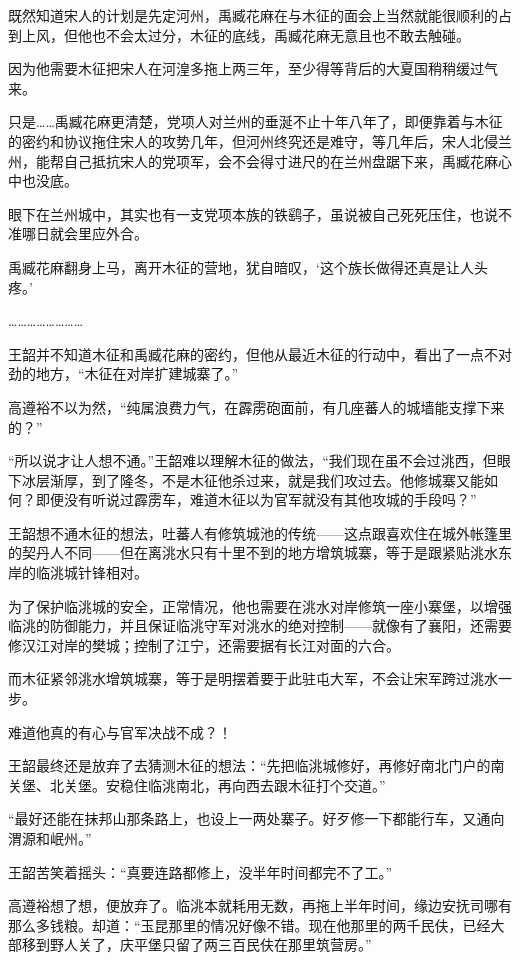 既然知道宋人的计划是先定河州，禹臧花麻在与木征的面会上当然就能很顺利的占到上风，但他也不会太过分，木征的底线，禹臧花麻无意且也不敢去触碰。

因为他需要木征把宋人在河湟多拖上两三年，至少得等背后的大夏国稍稍缓过气来。

只是……禹臧花麻更清楚，党项人对兰州的垂涎不止十年八年了，即便靠着与木征的密约和协议拖住宋人的攻势几年，但河州终究还是难守，等几年后，宋人北侵兰州，能帮自己抵抗宋人的党项军，会不会得寸进尺的在兰州盘踞下来，禹臧花麻心中也没底。

眼下在兰州城中，其实也有一支党项本族的铁鹞子，虽说被自己死死压住，也说不准哪日就会里应外合。

禹臧花麻翻身上马，离开木征的营地，犹自暗叹，‘这个族长做得还真是让人头疼。’

……………………

王韶并不知道木征和禹臧花麻的密约，但他从最近木征的行动中，看出了一点不对劲的地方，“木征在对岸扩建城寨了。”

高遵裕不以为然，“纯属浪费力气，在霹雳砲面前，有几座蕃人的城墙能支撑下来的？”

“所以说才让人想不通。”王韶难以理解木征的做法，“我们现在虽不会过洮西，但眼下冰层渐厚，到了隆冬，不是木征他杀过来，就是我们攻过去。他修城寨又能如何？即便没有听说过霹雳车，难道木征以为官军就没有其他攻城的手段吗？”

王韶想不通木征的想法，吐蕃人有修筑城池的传统——这点跟喜欢住在城外帐篷里的契丹人不同——但在离洮水只有十里不到的地方增筑城寨，等于是跟紧贴洮水东岸的临洮城针锋相对。

为了保护临洮城的安全，正常情况，他也需要在洮水对岸修筑一座小寨堡，以增强临洮的防御能力，并且保证临洮守军对洮水的绝对控制——就像有了襄阳，还需要修汉江对岸的樊城；控制了江宁，还需要据有长江对面的六合。

而木征紧邻洮水增筑城寨，等于是明摆着要于此驻屯大军，不会让宋军跨过洮水一步。

难道他真的有心与官军决战不成？！

王韶最终还是放弃了去猜测木征的想法：“先把临洮城修好，再修好南北门户的南关堡、北关堡。安稳住临洮南北，再向西去跟木征打个交道。”

“最好还能在抹邦山那条路上，也设上一两处寨子。好歹修一下都能行车，又通向渭源和岷州。”

王韶苦笑着摇头：“真要连路都修上，没半年时间都完不了工。”

高遵裕想了想，便放弃了。临洮本就耗用无数，再拖上半年时间，缘边安抚司哪有那么多钱粮。却道：“玉昆那里的情况好像不错。现在他那里的两千民伕，已经大部移到野人关了，庆平堡只留了两三百民伕在那里筑营房。”

